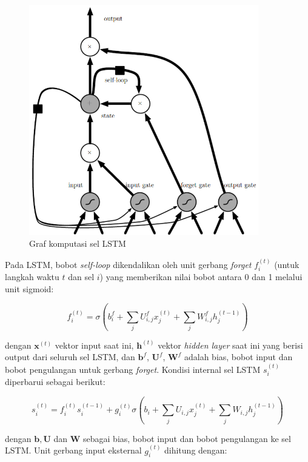 \begin{figure}
    \centering
    \includegraphics[width=10cm]{gambar/landasan-teori/lstm.png}
    \caption{Graf komputasi sel LSTM \citep{goodfellow-2016}}
    \label{gambar:lstm}
\end{figure}

Pada LSTM, bobot \textit{self-loop} dikendalikan oleh unit gerbang \textit{forget} $f_{i}^{(t)}$ (untuk langkah waktu $t$ dan sel $i$) yang memberikan nilai bobot antara 0 dan 1 melalui unit sigmoid:

\begin{equation}
    f_{i}^{(t)} = \sigma\left(b_{i}^{f} + \sum_{j} U_{i,j}^{f} x_{j}^{(t)} + \sum_{j} W_{i,j}^{f} h_{j}^{(t-1)}\right)
\end{equation}

\noindent
dengan $\pmb{x}^{(t)}$ vektor input saat ini, $\pmb{h}^{(t)}$ vektor \textit{hidden layer} saat ini yang berisi output dari seluruh sel LSTM, dan $\pmb{b}^{f}$, $\pmb{U}^{f}$, $\pmb{W}^{f}$ adalah bias, bobot input dan bobot pengulangan untuk gerbang \textit{forget}. Kondisi internal sel LSTM $s_{i}^{(t)}$ diperbarui sebagai berikut:

\begin{equation}
    s_{i}^{(t)} = f_{i}^{(t)}  s_{i}^{(t-1)} + g_{i}^{(t)} \sigma\left(b_{i} + \sum_{j} U_{i,j} x_{j}^{(t)} + \sum_{j} W_{i,j} h_{j}^{(t-1)} \right)
\end{equation}

\noindent
dengan $\pmb{b}, \pmb{U}$ dan $\pmb{W}$ sebagai bias, bobot input dan bobot pengulangan ke sel LSTM\@. Unit gerbang input eksternal $g_{i}^{(t)}$ dihitung dengan:

